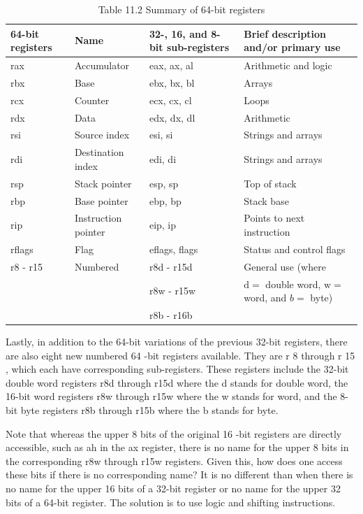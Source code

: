 \documentclass[10pt]{book}
\begin{document}
\begin{table}[htbp]
\begin{center}
\captionsetup{labelformat=empty}
\caption{Table 11.2 Summary of 64-bit registers}
\begin{tabular}{|l|l|l|l|}
\hline
64-bit registers & Name & 32-, 16, and 8-bit sub-registers & Brief description and/or primary use \\

\hline
rax & Accumulator & eax, ax, al & Arithmetic and logic \\
\hline
rbx & Base & ebx, bx, bl & Arrays \\
\hline
rcx & Counter & ecx, cx, cl & Loops \\
\hline
rdx & Data & edx, dx, dl & Arithmetic \\
\hline
rsi & Source index & esi, si & Strings and arrays \\
\hline
rdi & Destination index & edi, di & Strings and arrays \\
\hline
rsp & Stack pointer & esp, sp & Top of stack \\
\hline
rbp & Base pointer & ebp, bp & Stack base \\
\hline
rip & Instruction pointer & eip, ip & Points to next instruction \\
\hline
rflags & Flag & eflags, flags & Status and control flags \\
\hline
r8 - r15 & Numbered & r8d - r15d & General use (where \\
\hline
 &  & r8w - r15w & $\mathrm{d}=$ double word, $\mathrm{w}=$ word, and $b=$ byte) \\
\hline
 &  & r8b - r16b &  \\
\hline
\end{tabular}
\end{center}
\end{table}

Lastly, in addition to the 64-bit variations of the previous 32-bit registers, there are also eight new numbered 64 -bit registers available. They are r 8 through r 15 , which each have corresponding sub-registers. These registers include the 32-bit double word registers r8d through r15d where the d stands for double word, the 16-bit word registers r8w through r15w where the w stands for word, and the 8-bit byte registers r8b through r15b where the b stands for byte.


Note that whereas the upper 8 bits of the original 16 -bit registers are directly accessible, such as ah in the ax register, there is no name for the upper 8 bits in the corresponding r8w through r15w registers. Given this, how does one access these bits if there is no corresponding name? It is no different than when there is no name for the upper 16 bits of a 32-bit register or no name for the upper 32 bits of a 64-bit register. The solution is to use logic and shifting instructions.
\end{document}
